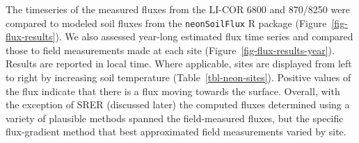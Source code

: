 \documentclass[
  letterpaper,
  DIV=11,
  numbers=noendperiod]{scrartcl}
\begin{document}
\begin{table}

\caption{\label{tbl-licor-results}Summary of measured soil
characteristics and flux results from field measurements across six NEON
sites using a LI-COR 6800 (LI-870/8250 measurements omitted to enable
direct comparability) via the closed-dynamic chamber method. Numeric
values for soil CO\(_{2}\) flux, soil temperature, and volumetric soil
water content (VSWC) are the mean and standard deviation of field
measurements at each site.}


\end{table}%

The timeseries of the measured fluxes from the LI-COR 6800 and 870/8250
were compared to modeled soil fluxes from the \texttt{neonSoilFlux} R
package (Figure~\ref{fig-flux-results}). We also assessed year-long
estimated flux time series and compared those to field measurements made
at each site (Figure~\ref{fig-flux-results-year}). Results are reported
in local time. Where applicable, sites are displayed from left to right
by increasing soil temperature (Table~\ref{tbl-neon-sites}). Positive
values of the flux indicate that there is a flux moving towards the
surface. Overall, with the exception of SRER (discussed later) the
computed fluxes determined using a variety of plausible methods spanned
the field-measured fluxes, but the specific flux-gradient method that
best approximated field measurements varied by site.
\end{document}
